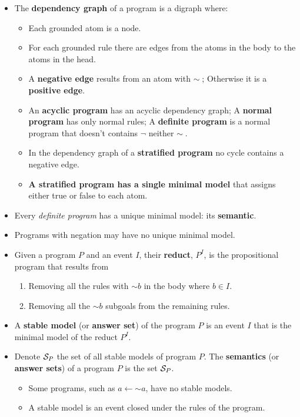 \documentclass{beamer}
\newcommand{\naf}{\ensuremath{\sim\!}}
\newcommand{\fml}[1]{\ensuremath{{\cal #1}}}
\newcommand{\deft}[1]{\textbf{#1}}
\begin{document}
\begin{frame}
\begin{itemize}
        \item The \deft{dependency graph} of a program is a digraph where:
        \begin{itemize}
            \item Each grounded atom is a node.
            \item For each grounded rule there are edges from the atoms in the body to the atoms in the head.
            \item A \deft{negative edge} results from an atom with $\naf\;$; Otherwise it is a \deft{positive edge}.
            \item An \deft{acyclic program} has an acyclic dependency graph; A \deft{normal program} has only normal rules; A \deft{definite program} is a normal program that doesn't contains $\neg$ neither $\naf\;$.
            \item In the dependency graph of a \deft{stratified program} no cycle contains a negative edge.
            \item \textbf{A stratified program has a single minimal model} that assigns either true or false to each atom.
        \end{itemize}
        \item Every \emph{definite program} has a unique minimal model: its \deft{semantic}.
        \item Programs with negation may have no unique minimal model.
        \item Given a program $P$ and an event $I$, their \deft{reduct}, $P^I$, is the propositional program that results from
        \begin{enumerate}
            \item Removing all the rules with $\naf b$ in the body where $b \in I$.
            \item Removing all the $\naf b$ subgoals from the remaining rules.
        \end{enumerate}
        \item A \deft{stable model} (or \deft{answer set}) of the program $P$ is an event $I$ that is the minimal model of the reduct $P^I$.  
        \item Denote $\fml{S}_P$ the set of all stable models of program $P$. The \deft{semantics} (or \deft{answer sets}) of a program $P$ is the set $\fml{S}_P$.
        \begin{itemize}
            \item Some programs, such as $a \leftarrow \naf a$, have no stable models.
            \item A stable model is an event closed under the rules of the program.
        \end{itemize}
    \end{itemize}
\end{frame}
\end{document}
